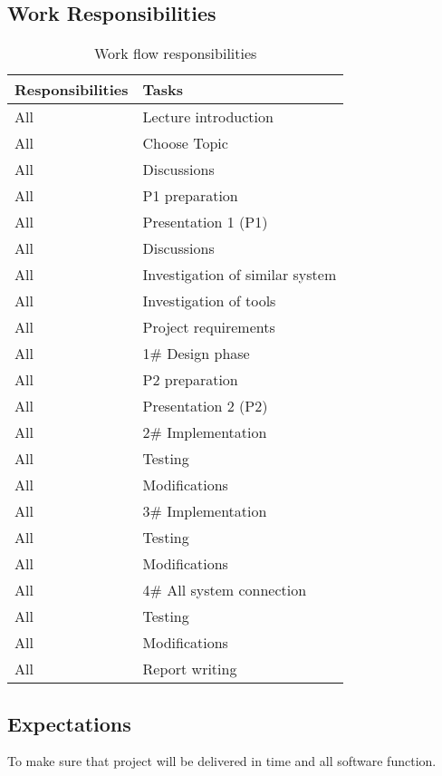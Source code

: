 \newpage
\subsection{Work Responsibilities}


\begin{table}[h]
	\centering
    \begin{tabular}{ | p{3cm} | p{5cm} |}
    \hline
    \textbf{Responsibilities} &  \textbf{Tasks} \\ \hline
    All & Lecture introduction\\ \hline
    All & Choose Topic\\ \hline
    All & Discussions\\ \hline
    All & P1 preparation\\ \hline
    All & Presentation 1 (P1)\\ \hline
    All & Discussions\\ \hline
    All & Investigation of similar system\\ \hline
    All & Investigation of tools\\ \hline
    All & Project requirements\\ \hline
    All & 1\# Design phase\\ \hline
    All & P2 preparation\\ \hline
    All & Presentation 2 (P2)\\ \hline
    All & 2\# Implementation\\ \hline
    All & Testing\\ \hline
    All & Modifications\\ \hline
    All & 3\# Implementation\\ \hline
    All & Testing\\ \hline
    All & Modifications\\ \hline
    All & 4\# All system connection\\ \hline
    All & Testing\\ \hline
    All & Modifications\\ \hline
    All & Report writing\\ \hline
 		\end{tabular}
 		\caption{Work flow responsibilities}
	\label{tab:WorkFlow}
\end{table}


\subsection{Expectations}

To make sure that project will be delivered in time and all software function.
